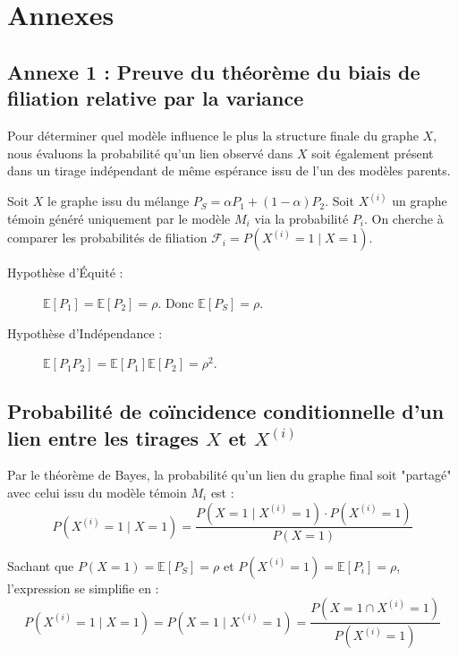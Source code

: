\section{Annexes}

\subsection{Annexe 1 : Preuve du théorème du biais de filiation relative par la variance}
\label{sec:Annexe 1}

Pour déterminer quel modèle influence le plus la structure finale du graphe $X$, nous évaluons la probabilité qu'un lien observé dans $X$ soit également présent dans un tirage indépendant de même espérance issu de l'un des modèles parents.

Soit $X$ le graphe issu du mélange $P_S = \alpha P_1 + (1-\alpha) P_2$. 
Soit $X^{(i)}$ un graphe témoin généré uniquement par le modèle $M_i$ via la probabilité $P_i$.
On cherche à comparer les probabilités de filiation $\mathcal{F}_i = P(X^{(i)} = 1 \mid X = 1)$.

\begin{description}
    \item[Hypothèse d'Équité :] $\mathbb{E}[P_1] = \mathbb{E}[P_2] = \rho$. Donc $\mathbb{E}[P_S] = \rho$.
    \item[Hypothèse d'Indépendance :] $\mathbb{E}[P_1 P_2] = \mathbb{E}[P_1]\mathbb{E}[P_2] = \rho^2$.
\end{description}

\subsection*{Probabilité de coïncidence conditionnelle d'un lien entre les tirages $X$ et $X^{(i)}$}

Par le théorème de Bayes, la probabilité qu'un lien du graphe final soit "partagé" avec celui issu du modèle témoin $M_i$ est :
\begin{equation}
    P(X^{(i)} = 1 \mid X = 1) = \frac{P(X = 1 \mid X^{(i)} = 1) \cdot P(X^{(i)} = 1)}{P(X = 1)}
\end{equation}

Sachant que $P(X = 1) = \mathbb{E}[P_S] = \rho$ et $P(X^{(i)} = 1) = \mathbb{E}[P_i] = \rho$, l'expression se simplifie en :
\begin{equation}
     P(X^{(i)} = 1 \mid X = 1) = P(X = 1 \mid X^{(i)} = 1) = \frac{P(X = 1 \cap X^{(i)} = 1)}{P(X^{(i)} = 1)}
\end{equation}

